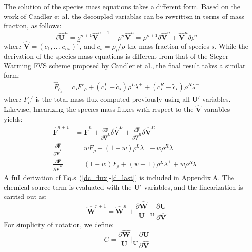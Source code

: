 \documentclass[]{aiaa-tc}%
\begin{document}
 The solution of the species mass equations takes a different form.  Based on the work of Candler et al.\cite{candler} the decoupled variables can be rewritten in terms of mass fraction, as follows:
 \begin{equation}
 	\delta \mathbf{\hat{U}}^n
	= \rho^{n+1}\mathbf{\hat{V}}^{n+1}-\rho^n\mathbf{\hat{V}}^n
	= \rho^{n+1} \delta \mathbf{\hat{V}}^n + \mathbf{\hat{V}}^n \delta \rho^n
\end{equation}
 where $\mathbf{\hat{V}}=(c_1,\hdots,c_{ns})^T$, and $c_s=\rho_s/\rho$ the mass fraction of species $s$.  While the derivation of the species mass equations is different from that of the Steger-Warming FVS scheme proposed by Candler et al.\cite{candler}, the final result takes a similar form: 
%
\begin{gather}
	\hat{F}_{\rho_s} = c_s F'_\rho+(c_s^L-\tilde{c}_s)\rho^L\lambda^+ + (c_s^R-\tilde{c}_s)\rho^R\lambda^- \label{dc_flux}
\end{gather}
%
where $F_\rho'$ is the total mass flux computed previously using all $\mathbf{U}'$ variables.  Likewise, linearizing the species mass fluxes with respect to the $\mathbf{\hat{V}}$ variables yields:
%
\begin{align}
	\mathbf{\hat{F}}^{n+1} &= \mathbf{\hat{F}}^n
	+\frac{\partial \mathbf{\hat{F}}}{\partial \mathbf{\hat{V}}^L}\delta \mathbf{\hat{V}}^L
	+\frac{\partial \mathbf{\hat{F}}}{\partial \mathbf{\hat{V}}^R}\delta \mathbf{\hat{V}}^R \\
	\frac{\partial \mathbf{\hat{F}}}{\partial \mathbf{\hat{V}}^L} &= wF_\rho+(1-w)\rho^L\lambda^+ - w\rho^R\lambda^- \\
	\frac{\partial \mathbf{\hat{F}}}{\partial \mathbf{\hat{V}}^R} &= (1-w)F_\rho+(w-1)\rho^L\lambda^+ + w\rho^R\lambda^- \label{d_last}
\end{align}
%
A full derivation of Eq.s~(\ref{dc_flux}-\ref{d_last}) is included in Appendix A.  The chemical source term is evaluated with the $\mathbf{U}'$ variables, and the linearization is carried out as:
%
\begin{equation}
	\mathbf{\hat{W}}^{n+1} = \mathbf{\hat{W}}^n+\frac{\partial \mathbf{\hat{W}}}{\mathbf{U}}\bigg|_{\mathbf{U}'}
	\frac{\partial \mathbf{U}}{\partial \mathbf{\hat{V}}}
\end{equation}
%
For simplicity of notation, we define:
%
\begin{equation}
C = \frac{\partial \mathbf{\hat{W}}}{\mathbf{U}}\bigg|_{\mathbf{U}'}
	\frac{\partial \mathbf{U}}{\partial \mathbf{\hat{V}}}
\end{equation}
\end{document}
